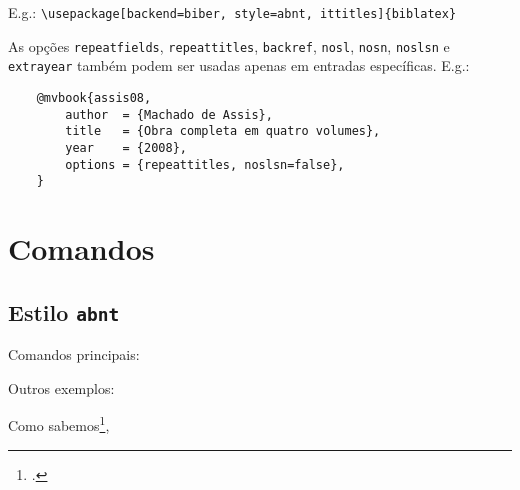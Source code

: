 \documentclass[a4paper]{article}
\begin{document}
\vspace{\baselineskip}
E.g.: \verb"\usepackage[backend=biber, style=abnt, ittitles]{biblatex}"

\begin{sloppypar}
  As opções \texttt{repeatfields}, \texttt{repeattitles}, \texttt{backref},
  \texttt{nosl}, \texttt{nosn}, \texttt{noslsn} e \texttt{extrayear} também
  podem ser usadas apenas em entradas específicas. E.g.:
\end{sloppypar}

\begin{verbatim}
    @mvbook{assis08,
        author  = {Machado de Assis},
        title   = {Obra completa em quatro volumes},
        year    = {2008},
        options = {repeattitles, noslsn=false},
    }
\end{verbatim}


\section{Comandos}%
\label{sec:comandos}

\subsection{Estilo \texttt{abnt}}%

Comandos principais:

\begin{example}
\cite{amaral15}
\end{example}

\begin{example}
\textcite{bosi08}
\end{example}

\begin{example}
\end{example}

\begin{example}
\cites{moretti09}{mann09}{amaral15}
\end{example}

\begin{example}
\textcites{moretti09}{mann09}{amaral15}
\end{example}

Outros exemplos:

\begin{example}
Como sabemos\footcite[Cf., e.g.,][]{assis08},
\end{example}

\begin{example}
\end{example}
\end{document}
